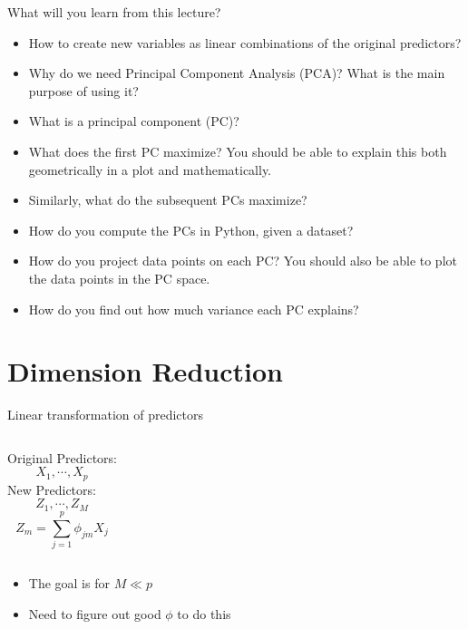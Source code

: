 \documentclass[aspectratio=169,usenames,dvipsnames]{beamer}
\newcommand{\InstructorList}[1]{
\begin{itemize}
	\color{orange}
	#1
\end{itemize}
}
\begin{document}
\begin{frame}[t]{What will you learn from this lecture?}
	\begin{itemize}
		\item How to create new variables as linear combinations of the original predictors?
		\item Why do we need Principal Component Analysis (PCA)? What is the main purpose of using it?
		\item What is a principal component (PC)?
		\item What does the first PC maximize? You should be able to explain this both geometrically in a plot and mathematically.
		\item Similarly, what do the subsequent PCs maximize?
		\item How do you compute the PCs in Python, given a dataset? 
		\item How do you project data points on each PC? You should also be able to plot the data points in the PC space. 
		\item How do you find out how much variance each PC explains?
	\end{itemize}

\end{frame}

\section{Dimension Reduction }


\begin{frame}[t]{Linear transformation of predictors }

\begin{columns}
\centering
Original Predictors:
\begin{equation*}
	X_1,\cdots,X_p
\end{equation*}
\centering
New Predictors:
\begin{equation*}
	Z_1,\cdots,Z_M
\end{equation*}
\begin{equation*}
	Z_m = \sum_{j=1}^p \phi_{jm}X_j
\end{equation*}

\end{columns}
\InstructorList{
\item The goal is for $M \ll p$
\item Need to figure out good $\phi$ to do this
}
\end{frame}
\end{document}
